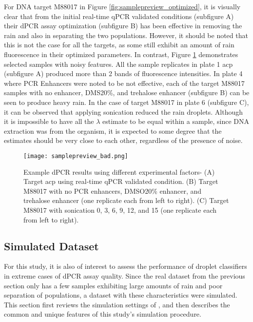 For DNA target M88017 in Figure \ref{fig:samplepreview_optimized}, it is visually clear that from the initial real-time qPCR validated conditions (subfigure A) their dPCR assay optimization (subfigure B) has been effective in removing the rain and also in separating the two populations. However, it should be noted that this is not the case for all the targets, as some still exhibit an amount of rain fluorescence in their optimized parameters. In contrast, Figure \ref{fig:samplepreview_bad} demonstrates selected samples with noisy features. All the sample replicates in plate 1 acp (subfigure A) produced more than 2 bands of fluorescence intensities. In plate 4 where PCR Enhancers were noted to be not effective, each of the target M88017 samples with no enhancer, DMS20\%, and trehalose enhancer (subfigure B) can be seen to produce heavy rain. In the case of target M88017 in plate 6 (subfigure C), it can be observed that applying sonication reduced the rain droplets. Although it is impossible to have all the \(\lambda\) estimate to be equal within a sample, since DNA extraction was from the organism, it is expected to some degree that the estimates should be very close to each other, regardless of the presence of noise.

\begin{figure}
    \centering
    \texttt{[image: samplepreview\_bad.png]}
    \caption[Example dPCR results using different experimental factors]%
    { Example dPCR results using different experimental factors- (A) Target acp using real-time qPCR validated condition. (B) Target M88017 with no PCR enhancers, DMSO20\% enhancer, and trehalose enhancer (one replicate each from left to right). (C) Target M88017 with sonication 0, 3, 6, 9, 12, and 15 (one replicate each from left to right).}
     \label{fig:samplepreview_bad}
\end{figure}

\subsection{Simulated Dataset}
\label{sec:simdataset}
For this study, it is also of interest to assess the performance of droplet classifiers in extreme cases of dPCR assay quality. Since the real dataset from the previous section only has a few samples exhibiting large amounts of rain and poor separation of populations, a dataset with these characteristics were simulated. This section first reviews the simulation settings of , and then describes the common and unique features of this study's simulation procedure.

